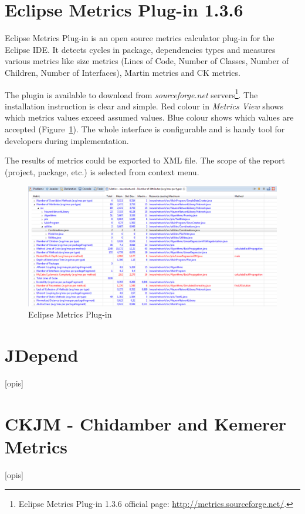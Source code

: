 \section{Eclipse Metrics Plug-in 1.3.6}
Eclipse Metrics Plug-in is an open source metrics calculator plug-in for the Eclipse IDE. It detects
cycles in package, dependencies types and measures various metrics like size metrics (Lines of Code, Number of Classes, Number of Children, Number of Interfaces), Martin metrics and \ac{CK metrics}. 

The plugin is available to download from \textit{sourceforge.net} servers\footnote{Eclipse Metrics Plug-in 1.3.6 official page: \url{http://metrics.sourceforge.net/}.}. The installation instruction is clear and simple. Red colour in \textit{Metrics View} shows which metrics values exceed assumed values. Blue colour shows which values are accepted (Figure~\ref{fig:eclipsemetrics}). The whole interface is configurable and is handy tool for developers during implementation. 

The results of metrics could be exported to XML file. The scope of the report (project, package, etc.) is selected from context menu.

\begin{figure}[h!]
	\centering
	\includegraphics[scale=0.45]{img/eclipse-plugin.png} 
	\caption{Eclipse Metrics Plug-in}		
	\label{fig:eclipsemetrics}
\end{figure}

\section{JDepend}
[opis]

\section{CKJM - Chidamber and Kemerer Metrics}
[opis]

